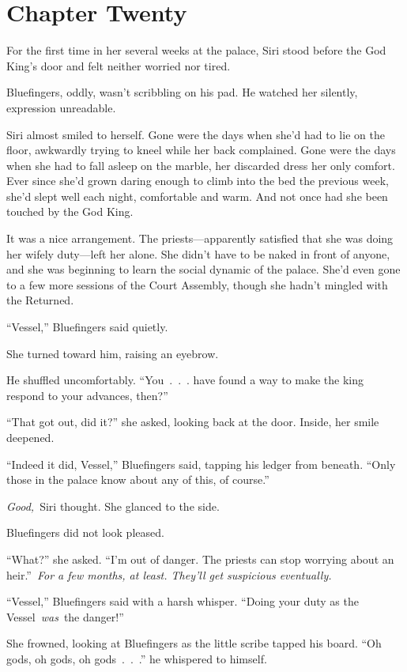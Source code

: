 \section{Chapter Twenty}

For the first time in her several weeks at the palace, Siri stood before the God King’s door and felt neither worried nor tired.

Bluefingers, oddly, wasn’t scribbling on his pad. He watched her silently, expression unreadable.

Siri almost smiled to herself. Gone were the days when she’d had to lie on the floor, awkwardly trying to kneel while her back complained. Gone were the days when she had to fall asleep on the marble, her discarded dress her only comfort. Ever since she’d grown daring enough to climb into the bed the previous week, she’d slept well each night, comfortable and warm. And not once had she been touched by the God King.

It was a nice arrangement. The priests—apparently satisfied that she was doing her wifely duty—left her alone. She didn’t have to be naked in front of anyone, and she was beginning to learn the social dynamic of the palace. She’d even gone to a few more sessions of the Court Assembly, though she hadn’t mingled with the Returned.

“Vessel,” Bluefingers said quietly.

She turned toward him, raising an eyebrow.

He shuffled uncomfortably. “You~.~.~. have found a way to make the king respond to your advances, then?”

“That got out, did it?” she asked, looking back at the door. Inside, her smile deepened.

“Indeed it did, Vessel,” Bluefingers said, tapping his ledger from beneath. “Only those in the palace know about any of this, of course.”

\textit{Good,}~Siri thought. She glanced to the side.

Bluefingers did not look pleased.

“What?” she asked. “I’m out of danger. The priests can stop worrying about an heir.”~\textit{For a few months, at least. They’ll get suspicious eventually.}

“Vessel,” Bluefingers said with a harsh whisper. “Doing your duty as the Vessel~\textit{was}~the danger!”

She frowned, looking at Bluefingers as the little scribe tapped his board. “Oh gods, oh gods, oh gods~.~.~.” he whispered to himself.

